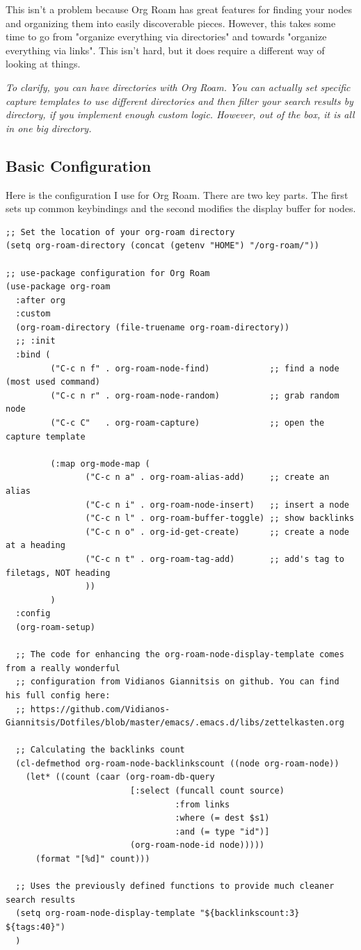 \documentclass[11pt]{article}
\begin{document}
This isn't a problem because Org Roam has great features for finding your nodes and organizing them into easily discoverable pieces. However, this takes some time to go from "organize everything via directories" and towards "organize everything via links". This isn't hard, but it does require a different way of looking at things.

\emph{To clarify, you can have directories with Org Roam. You can actually set specific capture templates to use different directories and then filter your search results by directory, if you implement enough custom logic. However, out of the box, it is all in one big directory.}
\subsection*{Basic Configuration}
\label{sec:orgce2d6e7}
Here is the configuration I use for Org Roam. There are two key parts. The first sets up common keybindings and the second modifies the display buffer for nodes.

\begin{verbatim}
;; Set the location of your org-roam directory
(setq org-roam-directory (concat (getenv "HOME") "/org-roam/"))

;; use-package configuration for Org Roam
(use-package org-roam
  :after org
  :custom
  (org-roam-directory (file-truename org-roam-directory))
  ;; :init
  :bind (
         ("C-c n f" . org-roam-node-find)            ;; find a node (most used command)
         ("C-c n r" . org-roam-node-random)          ;; grab random node
         ("C-c C"   . org-roam-capture)              ;; open the capture template

         (:map org-mode-map (
                ("C-c n a" . org-roam-alias-add)     ;; create an alias
                ("C-c n i" . org-roam-node-insert)   ;; insert a node
                ("C-c n l" . org-roam-buffer-toggle) ;; show backlinks
                ("C-c n o" . org-id-get-create)      ;; create a node at a heading
                ("C-c n t" . org-roam-tag-add)       ;; add's tag to filetags, NOT heading
                ))
         )
  :config
  (org-roam-setup)

  ;; The code for enhancing the org-roam-node-display-template comes from a really wonderful
  ;; configuration from Vidianos Giannitsis on github. You can find his full config here:
  ;; https://github.com/Vidianos-Giannitsis/Dotfiles/blob/master/emacs/.emacs.d/libs/zettelkasten.org

  ;; Calculating the backlinks count
  (cl-defmethod org-roam-node-backlinkscount ((node org-roam-node))
    (let* ((count (caar (org-roam-db-query
                         [:select (funcall count source)
                                  :from links
                                  :where (= dest $s1)
                                  :and (= type "id")]
                         (org-roam-node-id node)))))
      (format "[%d]" count)))

  ;; Uses the previously defined functions to provide much cleaner search results
  (setq org-roam-node-display-template "${backlinkscount:3} ${tags:40}")
  )
\end{verbatim}
\end{document}
